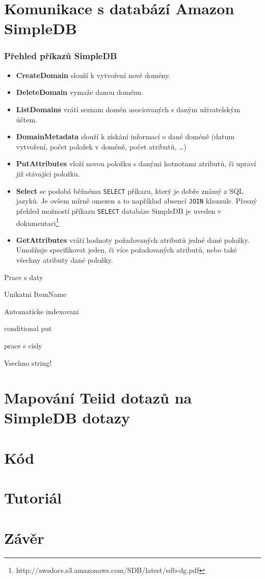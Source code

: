 \documentclass[oneside,11pt]{fithesis2}
\begin{document}
\chapter{Komunikace s databází Amazon SimpleDB}
\subsection*{Přehled příkazů SimpleDB}
\begin{itemize}
 \item \textbf{CreateDomain} slouží k vytvoření nové domény.
 \item \textbf{DeleteDomain} vymaže danou doménu.
 \item \textbf{ListDomains} vrátí seznam domén asociovaných s daným uživatelským účtem.
 \item \textbf{DomainMetadata} slouží k získání informací o dané doméně (datum vytvoření, počet položek v doméně, počet atributů, \dots)
 \item \textbf{PutAttributes} vloží novou položku s danými hotnotami atributů, či upraví již stávající položku.
 \item \textbf{Select} se podobá běžnému \verb<SELECT< příkazu, který je dobře známý z SQL jazyků. Je ovšem mírně omezen a to například absencí \verb<JOIN< klauzule. Přesný přehled možností příkazu \verb<SELECT< databáze SimpleDB je uveden v dokumentaci\footnote{http://awsdocs.s3.amazonaws.com/SDB/latest/sdb-dg.pdf}
 \item \textbf{GetAttributes} vrátí hodnoty požadovaných atributů jedné dané položky. Umožňuje specifikovat jeden, či více požadovaných atributů, nebo také všechny atributy dané položky.
\end{itemize}


Prace s daty 

Unikatni ItemName

Automaticke indexovani

conditional put

prace s cisly

Vsechno string!
\chapter{Mapování Teiid dotazů na SimpleDB dotazy}
\chapter{Kód}
\chapter{Tutoriál}
\chapter{Závěr}
\end{document}
